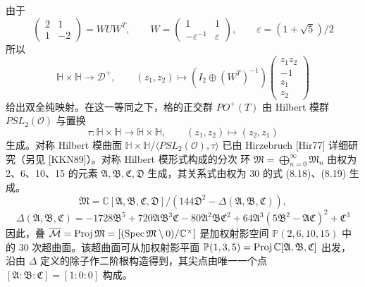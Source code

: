 由于
\begin{equation}
  \begin{pmatrix}2&1\\1&-2\end{pmatrix}=WUW^{T},\qquad
  W=\begin{pmatrix}1&1\\ -\varepsilon^{-1}&\varepsilon\end{pmatrix},\qquad
  \varepsilon=(1+\sqrt{5})/2 \tag{8.15}
\end{equation}
所以
\begin{equation}
  \mathbb{H}\times\mathbb{H}\to\mathcal{D}^{+},\qquad
  (z_{1},z_{2})\mapsto(I_{2}\oplus(W^{T})^{-1})
  \begin{pmatrix}z_{1}z_{2}\\ -1\\ z_{1}\\ z_{2}\end{pmatrix} \tag{8.16}
\end{equation}
给出双全纯映射。在这一等同之下，格的正交群 $PO^{+}(T)$ 由 Hilbert 模群
$PSL_{2}(\mathcal{O})$ 与置换
\begin{equation}
  \tau\colon\mathbb{H}\times\mathbb{H}\to\mathbb{H}\times\mathbb{H},\qquad
  (z_{1},z_{2})\mapsto(z_{2},z_{1}) \tag{8.17}
\end{equation}
生成。对称 Hilbert 模曲面 $\mathbb{H}\times\mathbb{H}/\langle PSL_{2}(\mathcal{O}),\tau\rangle$
已由 Hirzebruch [Hir77] 详细研究（另见 [KKN89]）。对称 Hilbert 模形式构成的分次
环 $\mathfrak{M}=\bigoplus_{n=0}^{\infty}\mathfrak{M}_{n}$ 由权为 2、6、10、15 的元素
$\mathfrak{A},\mathfrak{B},\mathfrak{C},\mathfrak{D}$ 生成，其关系式由权为 30 的式 (8.18)、(8.19) 生成。
\begin{equation}
  \mathfrak{M}=\mathbb{C}[\mathfrak{A},\mathfrak{B},\mathfrak{C},\mathfrak{D}]
  /(144\mathfrak{D}^{2}-\Delta(\mathfrak{A},\mathfrak{B},\mathfrak{C})), \tag{8.18}
\end{equation}
\begin{equation}
  \Delta(\mathfrak{A},\mathfrak{B},\mathfrak{C})
  =-1728\mathfrak{B}^{5}+720\mathfrak{A}\mathfrak{B}^{3}\mathfrak{C}
  -80\mathfrak{A}^{2}\mathfrak{B}\mathfrak{C}^{2}
  +64\mathfrak{A}^{3}(5\mathfrak{B}^{2}-\mathfrak{A}\mathfrak{C})^{2}
  +\mathfrak{C}^{3} \tag{8.19}
\end{equation}
因此，叠 $\overline{\mathcal{M}}=\operatorname{Proj}\mathfrak{M}=[(\operatorname{Spec}\mathfrak{M}\setminus 0)/\mathbb{C}^{\times}]$
是加权射影空间 $\mathbb{P}(2,6,10,15)$ 中的 30 次超曲面。该超曲面可从加权射影平面
$\mathbb{P}(1,3,5)=\operatorname{Proj}\mathbb{C}[\mathfrak{A},\mathfrak{B},\mathfrak{C}]$ 出发，沿由 $\Delta$
定义的除子作二阶根构造得到，其尖点由唯一一个点 $[\mathfrak{A}:\mathfrak{B}:\mathfrak{C}]=[1:0:0]$ 构成。

